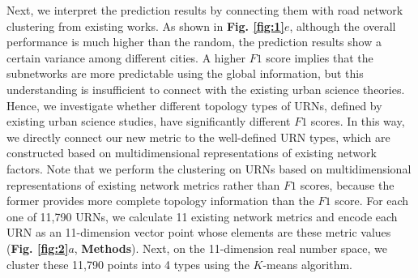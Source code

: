 \documentclass[10pt]{wlscirep}
\begin{document}
Next, we interpret the prediction results by connecting them with road network clustering from existing works. As shown in \textbf{Fig. \ref{fig:1}$e$}, although the overall performance is much higher than the random, the prediction results show a certain variance among different cities. A higher $F1$ score implies that the subnetworks are more predictable using the global information, but this understanding is insufficient to connect with the existing urban science theories. Hence, we investigate whether different topology types of URNs, defined by existing urban science studies\cite{barrington2019global,barrington2020global}, have significantly different $F1$ scores. In this way, we directly connect our new metric to the well-defined URN types, which are constructed based on multidimensional representations of existing network factors. Note that we perform the clustering on URNs based on multidimensional representations of existing network metrics rather than $F1$ scores, because the former provides more complete topology information than the $F1$ score.
For each one of 11,790 URNs, we calculate 11 existing network metrics and encode each URN as an 11-dimension vector point whose elements are these metric values (\textbf{Fig. \ref{fig:2}$a$}, \textbf{Methods}). Next, on the 11-dimension real number space, we cluster these 11,790 points into 4 types using the $K$-means algorithm.
\end{document}
